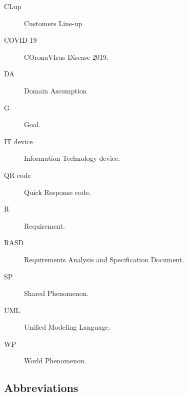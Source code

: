 \documentclass[../../main.tex]{subfiles}
\begin{document}
\begin{description}
    
    \item[CLup] Customers Line-up
    
    \item[COVID-19] COronaVIrus Disease 2019.
    
    \item[DA] Domain Assumption
    
    \item[G] Goal.
    
    \item[IT device] Information Technology device.
    
    \item[QR code] Quick Response code.

    \item[R] Requirement. 
    
    \item[RASD] Requirements Analysis and Specification Document.
    
    \item[SP] Shared Phenomenon.
    
    \item[UML] Unified Modeling Language.
    
    \item[WP] World Phenomenon.
\end{description}

\subsection{Abbreviations}
\end{document}
